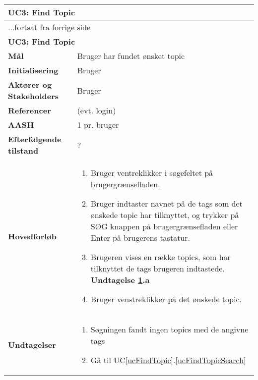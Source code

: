 \begin{center} \centering \label{ucFindTopic}
	\begin{longtable}{|p{4.6cm}|p{9.4cm}|}  %
	\hline
		\multicolumn{2}{|l|}{\textbf{UC3: Find Topic}} \\\hline
		\endfirsthead
		
		\multicolumn{2}{l}{...fortsat fra forrige side} \\ \hline %
		\multicolumn{2}{|l|}{\textbf{UC3: Find Topic}} \\\hline
		\endhead	
		
		\textbf{Mål}						& Bruger har fundet ønsket topic
		\\\hline
		\textbf{Initialisering}			& Bruger
		\\\hline
		\textbf{Aktører og Stakeholders}	&Bruger
		\\\hline 
		\textbf{Referencer}				& (evt. login)
		\\\hline
		\textbf{AASH}					& 1 pr. bruger
		\\\hline
		\textbf{Efterfølgende tilstand}	& ?
		\\\hline
		\textbf{Hovedforløb}					
			&\begin{enumerate}
				\item Bruger ventreklikker i søgefeltet på brugergrænsefladen.
				\item \label{ucFindTopicSearch} Bruger indtaster navnet på de tags %
				som det ønskede topic har tilknyttet, og trykker på SØG knappen på brugergrænsefladen eller Enter på brugerens tastatur.
				\item \label{ucFindTopicNoResults} Brugeren vises en række topics, som har tilknyttet de tags brugeren indtastede.
				\textbf{Undtagelse \ref{ucFindTopicNoResults}.a} \newline
				\item Bruger venstreklikker på det ønskede topic.
				
			\end{enumerate}\\\hline
		\textbf{Undtagelser}
			&\begin{enumerate} [label=\ref{ucFindTopicNoResults}.a]
				\item Søgningen fandt ingen topics med de angivne tags %
				\item Gå til UC\ref{ucFindTopic}.\ref{ucFindTopicSearch}
			\end{enumerate}
						
			\\\hline
	\end{longtable} 
\end{center}